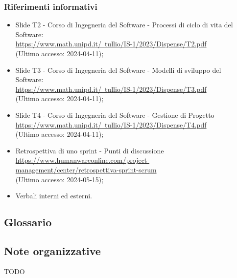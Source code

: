 \subsubsection{Riferimenti informativi}
\begin{itemize}
  \item Slide T2 - Corso di Ingegneria del Software - Processi di ciclo di vita del Software: \\ \href{https://www.math.unipd.it/~tullio/IS-1/2023/Dispense/T2.pdf}{https://www.math.unipd.it/~tullio/IS-1/2023/Dispense/T2.pdf}  \\ (Ultimo accesso: 2024-04-11);
  \item Slide T3 - Corso di Ingegneria del Software - Modelli di sviluppo del Software: \\ \href{https://www.math.unipd.it/~tullio/IS-1/2023/Dispense/T3.pdf}{https://www.math.unipd.it/~tullio/IS-1/2023/Dispense/T3.pdf}  \\ (Ultimo accesso: 2024-04-11);
  \item Slide T4 - Corso di Ingegneria del Software - Gestione di Progetto \\ \href{https://www.math.unipd.it/~tullio/IS-1/2023/Dispense/T4.pdf}{https://www.math.unipd.it/~tullio/IS-1/2023/Dispense/T4.pdf}  \\ (Ultimo accesso: 2024-04-11);
  \item Retrospettiva di uno sprint - Punti di discussione \\ \href{https://www.humanwareonline.com/project-management/center/retrospettiva-sprint-scrum}{https://www.humanwareonline.com/project-management/center/retrospettiva-sprint-scrum}  \\ (Ultimo accesso: 2024-05-15);
  \item Verbali interni ed esterni.
\end{itemize}

\subsection{Glossario} 
\GlossarioIntroduzione

\subsection{Note organizzative}
TODO